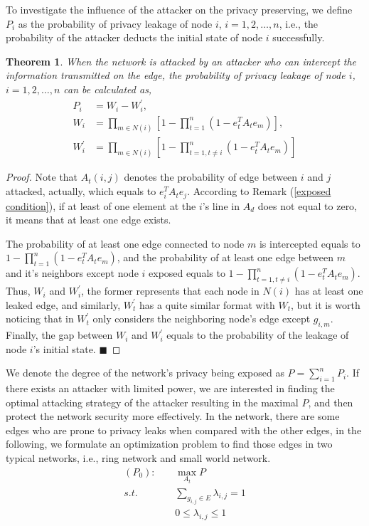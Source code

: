 \documentclass[10pt,journal,compsoc]{IEEEtran}
\newtheorem{thm}{Theorem}
\newtheorem{proof}{Proof}
\begin{document}
To investigate the influence of the attacker on the privacy preserving, we define $P_i$ as the probability of privacy leakage of node $i$, $i=1,2,\ldots,n$, i.e., the probability
of the attacker deducts the initial state of node $i$ successfully.
\begin{thm}\label{Them of leakage possibility}
When the network is attacked by an attacker who can intercept the information transmitted on the edge, the probability of privacy leakage of node $i$, $i=1,2,\ldots,n$ can be calculated as,
\begin{equation}
\begin{split} \label{leakage possibility}
P_i&=W_{i}-W_{i}^{'}, \\
W_{i}&=\prod_{m\in N(i)}[1-\prod_{t=1}^{n}(1-e_{t}^{T}A_{t}e_m)], \\
W_{i}^{'}&=\prod_{m\in N(i)}[1-\prod_{t=1, t\neq i}^{n}(1-e_{t}^{T}A_{t}e_m)]
\end{split}
\end{equation}
\end{thm}
\begin{proof}
Note that $A_t(i, j)$ denotes the probability of edge between $i$ and $j$ attacked, actually, which equals to $e_i^{T}A_{t}e_{j}$. According to Remark (\ref{exposed condition}), if at least of one element at the $i$'s line in $A_d$ does not equal to zero, it means that at least one edge exists.

The probability of at least one edge connected to node $m$ is intercepted equals to $1-\prod_{t=1}^{n}(1-e_{t}^{T}A_{t}e_m)$, and the probability of at least one edge between $m$ and it's neighbors except node $i$ exposed equals to $1-\prod_{t=1, t\neq i}^{n}(1-e_{t}^{T}A_{t}e_m)$. Thus, $W_{i}$ and $W_{i}^{'}$, the former represents that each node in $N(i)$ has at least one leaked edge, and similarly, $W_{t}^{'}$ has a quite similar format with $W_{t}$, but it is worth noticing that in $W_{t}^{'}$ only considers the neighboring node's edge except $g_{i, m}$. Finally, the gap between $W_{i}$ and $W_{i}^{'}$ equals to the probability of the leakage of node $i$'s initial state. $\blacksquare$
\end{proof}

We denote the degree of the network's privacy being exposed as $P=\sum_{i=1}^{n}P_i$. If there exists an attacker with limited power, we are interested in finding the optimal attacking strategy of the attacker resulting in the maximal $P$, and then protect the network security more effectively. In the network, there are some edges who are prone to privacy leaks when compared with the other edges, in the following, we formulate an optimization problem to find those edges in two typical networks, i.e., ring network and small world network.
\begin{equation} \label{Optimal_problem}
\begin{split}
(P_0):~~~~~&\max_{A_t}{P}\\
s.t. &\sum_{g_{i,j}\in E}\lambda_{i, j}=1 \\
&0\leq \lambda_{i,j}\leq 1
\end{split}
\end{equation}
\end{document}
